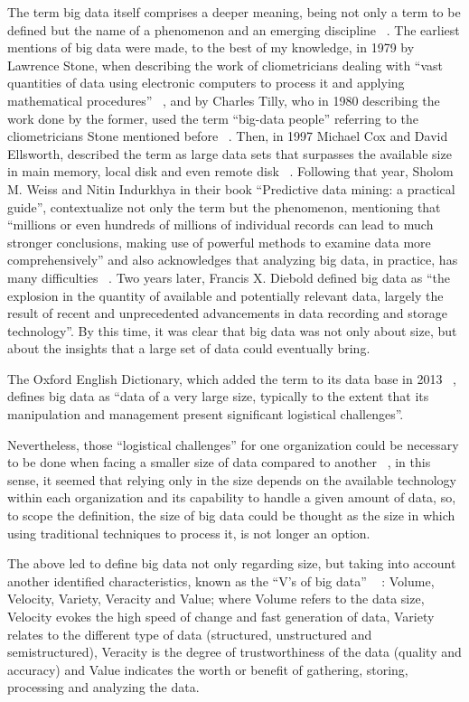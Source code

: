 The term big data itself comprises a deeper meaning, being not only a term to be
defined but the name of a phenomenon and an emerging discipline ~\cite{Diebold2012}. 
The earliest mentions of big data were made, to the best of my knowledge, in 1979 by Lawrence
Stone, when describing the work of cliometricians dealing with “vast quantities of data
using electronic computers to process it and applying mathematical procedures” ~\cite{Lawrence1979},
and by Charles Tilly, who in 1980 describing the work done by the former, used the
term “big-data people” referring to the cliometricians Stone mentioned before ~\cite{Tilly1980}.
Then, in 1997 Michael Cox and David Ellsworth, described the term as large data
sets that surpasses the available size in main memory, local disk and even remote disk
~\cite{Cox1997}. Following that year, Sholom M. Weiss and Nitin Indurkhya in their book “Predictive data mining: a practical guide”, contextualize not only the term but the phenomenon, 
mentioning that “millions or even hundreds of millions of individual records can lead to much stronger conclusions, making use of powerful methods to examine
data more comprehensively” and also acknowledges that analyzing big data, in practice, has many difficulties ~\cite{Sholom1998}. Two years later, Francis X. Diebold defined big data
as “the explosion in the quantity of available and potentially relevant data, largely the
result of recent and unprecedented advancements in data recording and storage technology”. By this time, it was clear that big data was not only about size, but about
the insights that a large set of data could eventually bring.

The Oxford English Dictionary, which added the term to its data base in 2013
~\cite{OxfordDictionaries2013}, defines big data as “data of a very large size, typically to the extent that its
manipulation and management present significant logistical challenges”.

Nevertheless, those “logistical challenges” for one organization could be necessary
to be done when facing a smaller size of data compared to another ~\cite{Magoulas2009}, in this sense, it seemed that relying only in the size depends on the available technology within each organization and its capability to handle a given amount of data, so, to scope the definition, the size of big data could be thought as the size in which using traditional
techniques to process it, is not longer an option. 

The above led to define big data not only regarding size, but taking into account
another identified characteristics, known as the “V’s of big data” ~\cite{Marr2015} : Volume, Velocity, Variety, Veracity and Value; where Volume refers to the data size, Velocity
evokes the high speed of change and fast generation of data, Variety relates to the different type of data (structured, unstructured and semistructured), Veracity is the
degree of trustworthiness of the data (quality and accuracy) and Value indicates the
worth or benefit of gathering, storing, processing and analyzing the data.

